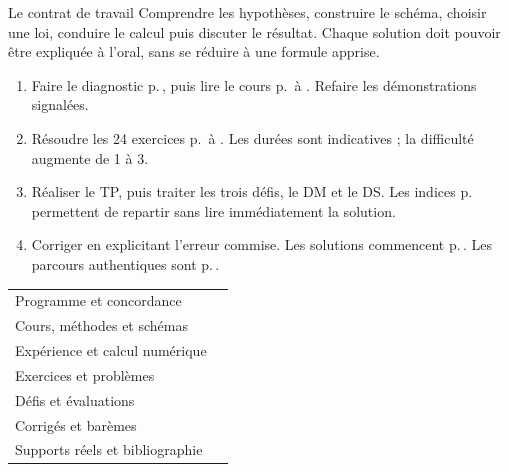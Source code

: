 \begin{loi}{Le contrat de travail}
Comprendre les hypothèses, construire le schéma, choisir une loi, conduire le calcul puis discuter le résultat. Chaque solution doit pouvoir être expliquée à l'oral, sans se réduire à une formule apprise.
\end{loi}
\begin{enumerate}
\item Faire le diagnostic p.\,\pageref{diagnostic}, puis lire le cours p.\,\pageref{c-sources} à \pageref{c-synthese}. Refaire les démonstrations signalées.
\item Résoudre les 24 exercices p.\,\pageref{td1} à \pageref{td8}. Les durées sont indicatives ; la difficulté augmente de 1 à 3.
\item Réaliser le TP, puis traiter les trois défis, le DM et le DS. Les indices p.\,\pageref{indices} permettent de repartir sans lire immédiatement la solution.
\item Corriger en explicitant l'erreur commise. Les solutions commencent p.\,\pageref{corr-diag}. Les parcours authentiques sont p.\,\pageref{authentiques}.
\end{enumerate}
\begin{tabularx}{\linewidth}{@{}Y r@{}}
\toprule
Programme et concordance & \pageref{concordance}\\
Cours, méthodes et schémas & \pageref{c-sources}\\
Expérience et calcul numérique & \pageref{c-tp}\\
Exercices et problèmes & \pageref{td1}\\
Défis et évaluations & \pageref{defis1}\\
Corrigés et barèmes & \pageref{corr-diag}\\
Supports réels et bibliographie & \pageref{authentiques}\\
\bottomrule
\end{tabularx}






